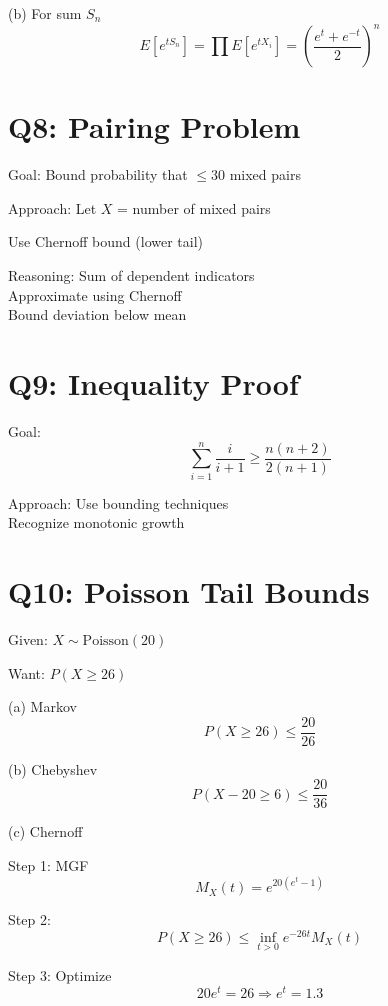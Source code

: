 \documentclass[11pt]{article}
\begin{document}
(b) For sum $S_n$
\[
E[e^{tS_n}] = \prod E[e^{tX_i}] = \left(\frac{e^t + e^{-t}}{2}\right)^n
\]

\vspace{0.5cm}

\section*{Q8: Pairing Problem}

Goal: Bound probability that $\le 30$ mixed pairs

Approach:
Let $X$ = number of mixed pairs

Use Chernoff bound (lower tail)

Reasoning:
Sum of dependent indicators \\
Approximate using Chernoff \\
Bound deviation below mean

\vspace{0.5cm}

\section*{Q9: Inequality Proof}

Goal:
\[
\sum_{i=1}^{n} \frac{i}{i+1} \ge \frac{n(n+2)}{2(n+1)}
\]

Approach:
Use bounding techniques \\
Recognize monotonic growth

\vspace{0.5cm}

\section*{Q10: Poisson Tail Bounds}

Given: $X \sim \text{Poisson}(20)$

Want: $P(X \ge 26)$

(a) Markov
\[
P(X \ge 26) \le \frac{20}{26}
\]

(b) Chebyshev
\[
P(X - 20 \ge 6) \le \frac{20}{36}
\]

(c) Chernoff

Step 1: MGF
\[
M_X(t) = e^{20(e^t - 1)}
\]

Step 2:
\[
P(X \ge 26) \le \inf_{t>0} e^{-26t} M_X(t)
\]

Step 3: Optimize
\[
20e^t = 26 \Rightarrow e^t = 1.3
\]
\end{document}
